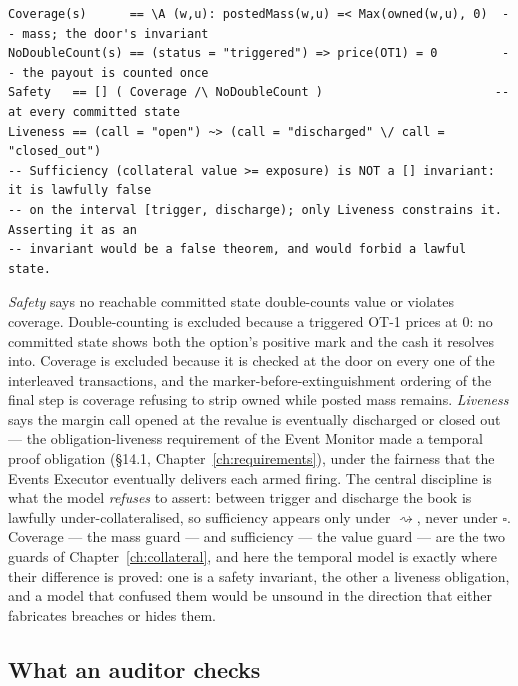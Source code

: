 \begin{lstlisting}
Coverage(s)      == \A (w,u): postedMass(w,u) =< Max(owned(w,u), 0)  -- mass; the door's invariant
NoDoubleCount(s) == (status = "triggered") => price(OT1) = 0         -- the payout is counted once
Safety   == [] ( Coverage /\ NoDoubleCount )                        -- at every committed state
Liveness == (call = "open") ~> (call = "discharged" \/ call = "closed_out")
-- Sufficiency (collateral value >= exposure) is NOT a [] invariant: it is lawfully false
-- on the interval [trigger, discharge); only Liveness constrains it. Asserting it as an
-- invariant would be a false theorem, and would forbid a lawful state.
\end{lstlisting}

\emph{Safety} says no reachable committed state double-counts value or violates coverage.
Double-counting is excluded because a triggered OT-1 prices at $0$: no committed state shows
both the option's positive mark and the  cash it resolves into. Coverage
is excluded because it is checked at the door on every one of the interleaved transactions,
and the marker-before-extinguishment ordering of the final step is coverage refusing to
strip owned while posted mass remains. \emph{Liveness} says the margin call opened at the
revalue is eventually discharged or closed out --- the obligation-liveness requirement of the
Event Monitor made a temporal proof obligation (\S 14.1, Chapter~\ref{ch:requirements}),
under the fairness that the Events Executor eventually delivers each armed firing. The
central discipline is what the model \emph{refuses} to assert: between trigger and discharge
the book is lawfully under-collateralised, so sufficiency appears only under
$\rightsquigarrow$, never under $\square$. Coverage --- the mass guard --- and sufficiency ---
the value guard --- are the two guards of Chapter~\ref{ch:collateral}, and here the temporal
model is exactly where their difference is proved: one is a safety invariant, the other a
liveness obligation, and a model that confused them would be unsound in the direction that
either fabricates breaches or hides them.

\subsection{What an auditor checks}

